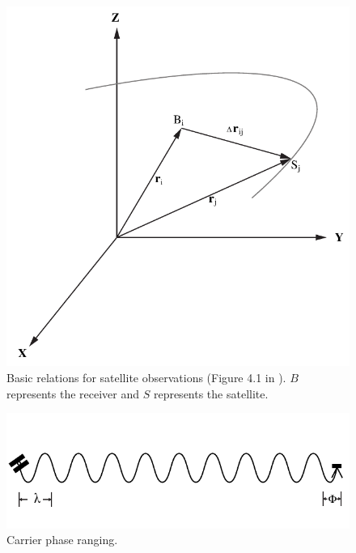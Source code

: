 \clearpage
\begin{figure}
	\centering
	\includegraphics{figs_chpt2/Fig1.pdf}	
	\caption[Basic relations for satellite observations.]{Basic relations for satellite observations (Figure 4.1 in \citet{seeber2003chpt2}). $B$ represents the receiver and $S$ represents the satellite.}
	\label{fig:chpt2_fig1}
\end{figure}

\clearpage
\begin{figure}
	\centering
	\includegraphics{figs_chpt2/Fig2.pdf}	
	\caption[Carrier phase ranging.]{Carrier phase ranging.}
	\label{fig:chpt2_fig2}
\end{figure}

